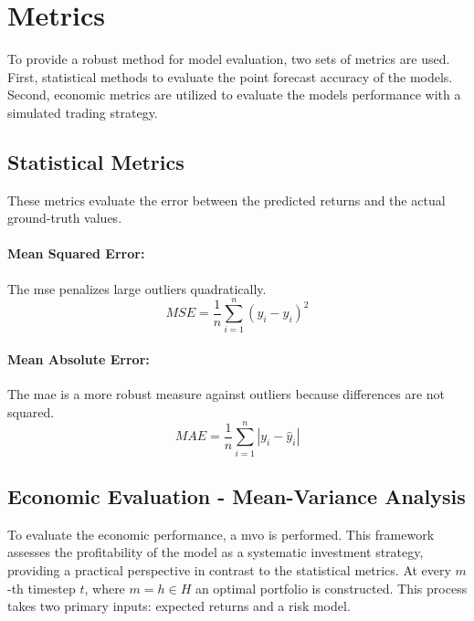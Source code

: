 \documentclass[12pt,twoside=false,a4paper,parskip]{scrbook}
\begin{document}
\section{Metrics}
To provide a robust method for model evaluation, two sets of metrics are used. 
First, statistical methods to evaluate the point forecast  accuracy of the models. Second, economic metrics are utilized to evaluate the models performance with a simulated trading strategy.

\subsection{Statistical Metrics}
    These metrics evaluate the error between the predicted returns and the actual ground-truth values. 

    \paragraph{Mean Squared Error:} The \gls{mse} penalizes large outliers quadratically. 
    \begin{equation}
        MSE = \frac{1}{n} \sum_{i=1}^{n} (y_i - \hat{y}_i)^2
    \end{equation}

    \paragraph{Mean Absolute Error:} The \gls{mae} is a more robust measure against outliers because differences are not squared.
    \begin{equation}
        MAE = \frac{1}{n} \sum_{i=1}^{n} |y_i - \hat{y}_i|
    \end{equation}


\subsection{Economic Evaluation - Mean-Variance Analysis}
To evaluate the economic performance, a \gls{mvo} is performed. This framework assesses the profitability of the model as a systematic investment strategy, providing a practical perspective in contrast to the statistical metrics.
At every $m$-th timestep $t$, where $m = h \in H$ 
an optimal portfolio is constructed. This process takes two primary inputs: expected returns and a risk model.
\end{document}
